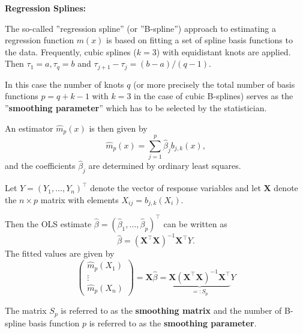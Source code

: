 \documentclass[14pt]{extreport}\usepackage[]{graphicx}\usepackage[]{xcolor}
\begin{document}
\textbf{Regression Splines:}

\bigskip

The so-called ''regression spline'' (or ''B-spline'') approach to estimating a regression function $m(x)$ is based
on fitting a set of spline basis functions to the data. Frequently, cubic splines ($k=3$) with equidistant knots are applied. Then $\tau_1=a, \tau_q=b$ and
$\tau_{j+1}-\tau_j=(b-a)/(q-1)$. 

\bigskip

In this case the number of knots $q$ (or more precisely the total number of basis functions $p=q+k-1$ with $k=3$ in the case of cubic B-splines) serves as the ''\textbf{smoothing parameter}''
which has to be selected by the statistician.

\bigskip

An estimator $\hat m_p(x)$ is then given by
$$\hat m_p(x)=\sum_{j=1}^p \hat\beta_j b_{j,k}(x),$$
 and the coefficients $\hat\beta_j$ are determined by ordinary
least squares.

\bigskip

Let $Y=(Y_1,\dots,Y_n)^\top $ denote the vector of response variables and let $\mathbf{X}$ denote the $n\times p$ matrix with elements $X_{ij}=b_{j,k}(X_i)$.

\bigskip

Then the OLS estimate 
$\hat \beta=(\hat\beta_1,\dots,\hat\beta_p)^\top $ can be written as
$$
\hat\beta=(\mathbf{X}^\top \mathbf{X})^{-1}\mathbf{X}^\top Y.
$$
The fitted values are given by
$$
\left(\begin{array}{c}
{\hat m}_p(X_1)\\
\vdots%
\\ {\hat m}_p(X_n)
\end{array}\right)=\mathbf{X}\hat\beta=\underbrace{\mathbf{X}(\mathbf{X}^\top \mathbf{X})^{-1}\mathbf{X}^\top }_{=:S_p}Y
$$

The matrix $S_p$ is referred to as the \textbf{smoothing matrix} and the number of B-spline basis function $p$ is referred to as the \textbf{smoothing parameter}. 

\bigskip
\end{document}
